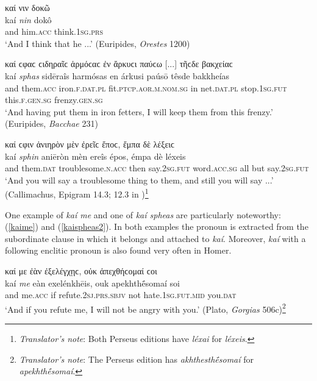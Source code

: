 \begin{exe}
\ex καί νιν δοκῶ\\
\gll kaí \emph{nin} dokô\\
and him.\textsc{acc} think.\textsc{1sg.prs}\\
\trans `And I think that he ...' (Euripides, \textit{Orestes} 1200)
\label{kainin}
\end{exe}

\begin{exe}
\ex καί ϲφαϲ ϲιδηραῖϲ ἁρμόϲαϲ ἐν ἄρκυϲι παύϲω {[}...{]} τῆϲδε βακχείαϲ\\
\gll kaí \emph{sphas} sidēraîs harmósas en árkusi paúsō têsde bakkheías\\
and them.\textsc{acc} iron.\textsc{f.dat.pl} fit.\textsc{ptcp.aor.m.nom.sg} in net.\textsc{dat.pl} stop.\textsc{1sg.fut} this.\textsc{f.gen.sg} frenzy.\textsc{gen.sg}\\
\trans `And having put them in iron fetters, I will keep them from this frenzy.' (Euripides, \textit{Bacchae} 231)
\label{kaisphas}
\end{exe}

\begin{exe}
\ex καί ϲφιν ἀνιηρὸν μὲν ἐρεῖϲ ἔποϲ, ἔμπα δὲ λέξειϲ\\
\gll kaí \emph{sphin} aniēròn mèn ereîs épos, émpa dè léxeis\\
and them.\textsc{dat} troublesome.\textsc{n.acc} then say.\textsc{2sg.fut} word.\textsc{acc.sg} all but say.\textsc{2sg.fut}\\
\trans `And you will say a troublesome thing to them, and still you will say ...' (Callimachus, Epigram 14.3; 12.3 in \citealp{Wilamowitz1882})\footnote{\emph{Translator's note}: Both Perseus editions have \textit{léxai} for \textit{léxeis}.}
\label{kaisphin4}
\end{exe}

One example of \textit{kaí me} and one of \textit{kaí spheas} are particularly noteworthy: (\ref{kaime}) and (\ref{kaispheas2}). In both examples the pronoun is extracted from the subordinate clause in which it belongs and attached to \textit{kaí}. Moreover, \textit{kaí} with a following enclitic pronoun is also found very often in Homer.

\begin{exe}
\ex καί με ἐὰν ἐξελέγχῃϲ, οὐκ ἀπεχθήϲομαί ϲοι\\
\gll kaí \emph{me} eàn exelénkhēis, ouk apekhthḗsomaí soi\\
and me.\textsc{acc} if refute.\textsc{2sj.prs.sbjv} not hate.\textsc{1sg.fut.mid} you.\textsc{dat}\\
\trans `And if you refute me, I will not be angry with you.' (Plato, \textit{Gorgias} 506c)\footnote{\emph{Translator's note}: The Perseus edition has \textit{akhthesthḗsomaí} for \textit{apekhthḗsomaí}.}
\label{kaime}
\end{exe}

